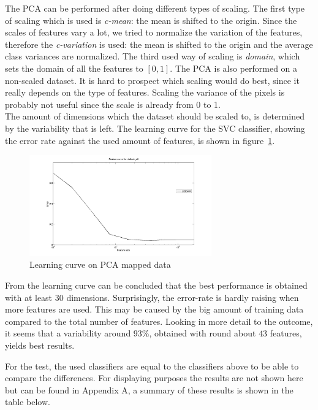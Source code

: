 \documentclass{article}
\begin{document}
The PCA can be performed after doing different types of scaling. The first type of scaling which is used is \emph{c-mean}: the mean is shifted to the origin. Since the scales of features vary a lot, we tried to normalize the variation of the features, therefore the \emph{c-variation} is used: the mean is shifted to the origin and the average class variances are normalized. The third used way of scaling is \emph{domain}, which sets the domain of all the features to $[0, 1]$. The PCA is also performed on a non-scaled dataset. It is hard to prospect which scaling would do best, since it really depends on the type of features. Scaling the variance of the pixels is probably not useful since the scale is already from 0 to 1. \\

The amount of dimensions which the dataset should be scaled to, is determined by the variability that is left. The learning curve for the SVC classifier, showing the error rate against the used amount of features, is shown in figure~\ref{fig:learningcurve-PCAmapped-data}.

\begin{figure}[H]
	\centering
		\includegraphics[trim = 25mm 10mm 25mm 20mm, clip,width=0.7\textwidth]{learningcurve-PCAmapped-data}
	\caption{Learning curve on PCA mapped data}
	\label{fig:learningcurve-PCAmapped-data}
\end{figure}

From the learning curve can be concluded that the best performance is obtained with at least $30$ dimensions. Surprisingly, the error-rate is hardly raising when more features are used. This may be caused by the big amount of training data compared to the total number of features. Looking in more detail to the outcome, it seems that a variability around $93 \%$, obtained with round about $43$ features, yields best results. 

For the test, the used classifiers are equal to the classifiers above to be able to compare the differences. For displaying purposes the results are not shown here but can be found in Appendix A, a summary of these results is shown in the table below.
\end{document}
